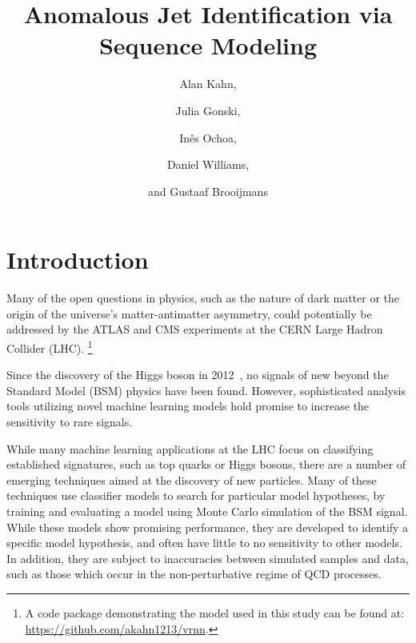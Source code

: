 \documentclass[11pt, a4paper]{article}
\title{Anomalous Jet Identification via Sequence Modeling}
\author[a]{Alan Kahn,}
\author[a]{Julia Gonski,}
\author[b]{In\^{e}s Ochoa,}
\author[a]{Daniel Williams,}
\author[a]{and Gustaaf Brooijmans}
\affiliation[a]{Nevis Laboratories, Columbia University, Irvington, NY, USA}
\affiliation[b]{Laboratory of Instrumentation and Experimental Particle Physics, Lisbon, Portugal}
\newcommand\blfootnote[1]{%
  \begingroup
  \renewcommand\thefootnote{}\footnote{#1}%
  \addtocounter{footnote}{-1}%
  \endgroup
}
\begin{document}
 



\baselineskip16pt

\maketitle 

\setlength{\abovedisplayskip}{5pt}
\setlength{\belowdisplayskip}{5pt}
\setlength{\abovedisplayshortskip}{0pt}
\setlength{\belowdisplayshortskip}{0pt}











\section{Introduction}



Many of the open questions in physics, such as the nature of dark matter or the origin of the universe's matter-antimatter asymmetry, could potentially be addressed by the ATLAS and CMS experiments at the CERN Large Hadron Collider (LHC).\blfootnote{A code package demonstrating the model used in this study can be found at: \url{https://github.com/akahn1213/vrnn}.}
Since the discovery of the Higgs boson in 2012~\cite{atlas_higgs,cms_higgs}, no signals of new beyond the Standard Model (BSM) physics have been found. 
However, sophisticated analysis tools utilizing novel machine learning models hold promise to increase the sensitivity to rare signals. 
 
While many machine learning applications at the LHC focus on classifying established signatures, such as top quarks or Higgs bosons, there are a number of emerging techniques aimed at the discovery of new particles. 
Many of these techniques use classifier models to search for particular model hypotheses, by training and evaluating a model using Monte Carlo simulation of the BSM signal.
While these models show promising performance, they are developed to identify a specific model hypothesis, and often have little to no sensitivity to other models. In addition, they are subject to inaccuracies between simulated samples and data, such as those which occur in the non-perturbative regime of QCD processes.
\end{document}

